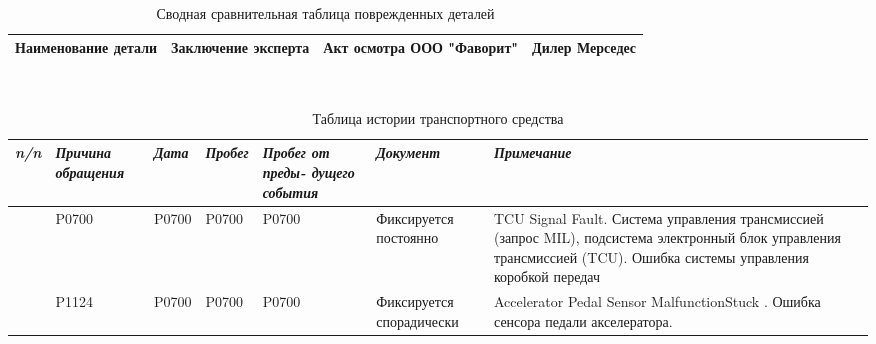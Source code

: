 {\footnotesize \
	\begin{longtable}{|p{25mm}|p{50mm}|p{50mm}|p{25mm}|}
		\caption{\footnotesize {Сводная сравнительная таблица поврежденных деталей}}
		\label{tab:sravnenie}\\ \hline
		\textbf{Наименование детали} & \textbf{Заключение эксперта} & \textbf{Акт осмотра ООО "Фаворит"} & \textbf{Дилер Мерседес} \\ \hline \endhead
		
		
\end{longtable}}



{\footnotesize \
\begin{longtable}[h]{c|m{25mm}|m{15mm}|m{15mm}|m{15mm}|m{30mm}|m{35mm}}
	\caption{Таблица истории транспортного средства}
	\label{table:история}\\ \hline
			\textit{\textbf{n/n}} 
			&\textit{\textbf{Причина обращения}} 
			&\textit{\textbf{Дата}} 
			&\textit{\textbf{Пробег}}
			&\textit{\textbf{Пробег от преды- дущего события}} 
	    	&\textit{\textbf{Документ}} 
		    &\textit{\textbf{Примечание}} \\
		\hline \endhead
		\Rownum & P0700 & P0700 & P0700 & P0700 & Фиксируется постоянно & TCU Signal Fault. Система управления трансмиссией (запрос MIL), подсистема электронный блок управления трансмиссией (TCU). Ошибка системы управления коробкой передач \\
		\hline
		\Rownum & P1124 & P0700 & P0700 & P0700 & Фиксируется спорадически & Accelerator Pedal Sensor MalfunctionStuck . Ошибка сенсора педали акселератора.\\ \hline
	\end{longtable}}\setcounter{rownum}{0}





















